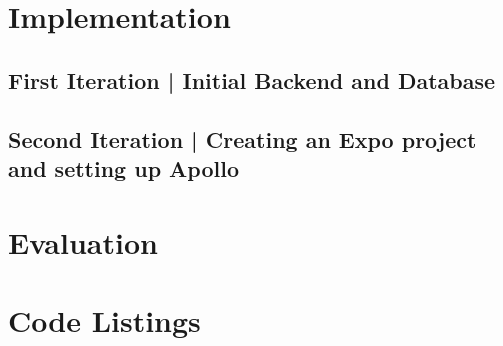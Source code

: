 \documentclass[11pt,a4paper]{report}
\begin{document}
\pagebreak

\chapter{Implementation}

\section{First Iteration | Initial Backend and Database}


\pagebreak
\section{Second Iteration | Creating an Expo project and setting up Apollo}


\pagebreak

%


\chapter{Evaluation}


\pagebreak

\chapter{Code Listings}
\end{document}
